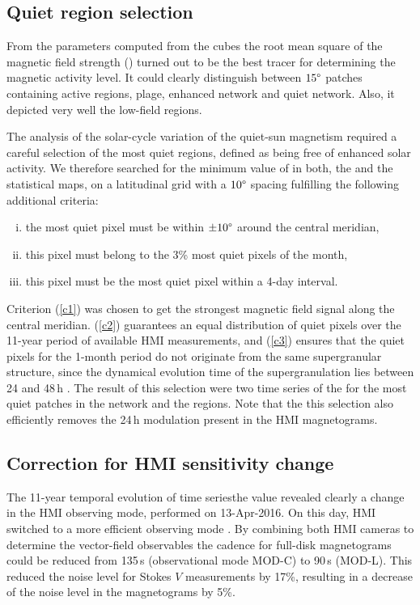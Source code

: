 \documentclass{aa}
\begin{document}
\subsection{Quiet region selection\label{quietregion}}

From the parameters computed from the cubes the root mean square of the magnetic field strength (\brms{}) turned out to be the best tracer for determining the magnetic activity level. It could clearly distinguish between $15\degree$ patches containing active regions, plage, enhanced network and quiet network. Also, it depicted very well the low-field \IN{} regions.

The analysis of the solar-cycle variation of the quiet-sun magnetism required a careful selection of the most quiet regions, defined as being free of enhanced solar activity. We therefore searched for the minimum value of \brms{} in both, the \nw{} and the \inw{} statistical maps, on a latitudinal grid with a $10\degree$ spacing fulfilling the following additional criteria:
\begin{enumerate}[(i)]
	\item\label{c1} the most quiet pixel must be within $\pm10\degree$ around the central meridian,
	\item\label{c2}  this pixel must belong to the 3\% most quiet pixels of the month,
	\item\label{c3}  this pixel must be the most quiet pixel within a 4-day interval.
\end{enumerate}

Criterion (\ref{c1}) was chosen to get the strongest magnetic field signal along the central meridian. (\ref{c2}) guarantees an equal distribution of quiet pixels over the 11-year period of available HMI measurements, and (\ref{c3}) ensures that the quiet pixels for the 1-month period do not originate from the same supergranular structure, since the dynamical evolution time of the supergranulation lies between 24 and 48\,h \cite[]{2010LRSP....7....2R}. The result of this selection were two time series of the \brms{} for the most quiet patches in the network and the \IN{} regions. Note that the this selection also efficiently removes the 24\,h modulation present in the HMI magnetograms.

\subsection{Correction for HMI sensitivity change\label{sensicorr}}

The 11-year temporal evolution of \inw{} time series{the \brms{}} value revealed clearly a change in the HMI observing mode, performed on 13-Apr-2016. On this day, HMI switched to a more efficient observing mode \cite[see][]{2018SoPh..293...45H,2014SoPh..289.3483H,2016SoPh..291.1887C}. By combining both HMI cameras to determine the vector-field observables the cadence for full-disk magnetograms could be reduced from 135\,s (observational mode MOD-C) to 90\,s (MOD-L). This reduced the noise level for Stokes $V$ measurements by 17\%, resulting in a decrease of the noise level in the \los{} magnetograms by 5\%.
\end{document}

